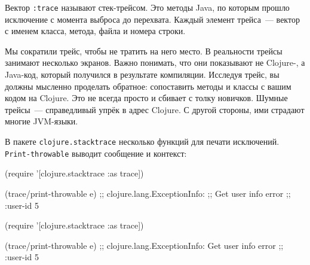 \else

\begin{english}
\end{english}

\fi


Вектор \verb|:trace| называют стек-трейсом. Это методы Java, по которым прошло
исключение с момента выброса до перехвата. Каждый элемент трейса~--- вектор с
именем класса, метода, файла и номера строки.

Мы сократили трейс, чтобы не тратить на него место. В реальности трейсы занимают
несколько экранов. Важно понимать, что они показывают не Clojure-, а Java-код,
который получился в результате компиляции. Исследуя трейс, вы должны мысленно
проделать обратное: сопоставить методы и классы с вашим кодом на Clojure. Это не
всегда просто и сбивает с толку новичков. Шумные трейсы~--- справедливый упрёк
в адрес Clojure. С другой стороны, ими страдают многие JVM-языки.


В пакете \verb|clojure.stacktrace| несколько функций для печати
исключений. \verb|Print-throwable| выводит сообщение и контекст:

\ifnarrow

\begin{english}
  \begin{clojure}
(require '[clojure.stacktrace :as trace])

(trace/print-throwable e)
;; clojure.lang.ExceptionInfo:
;; Get user info error
;; {:user-id 5}
  \end{clojure}
\end{english}

\else

\begin{english}
  \begin{clojure}
(require '[clojure.stacktrace :as trace])

(trace/print-throwable e)
;; clojure.lang.ExceptionInfo: Get user info error
;; {:user-id 5}
  \end{clojure}
\end{english}


